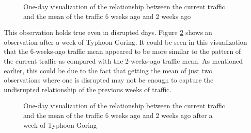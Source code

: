 \begin{figure}[h] 
\centering
  \caption{One-day visualization of the relationship between the current traffic and the mean of the traffic 6 weeks ago and 2 weeks ago}
  \label{figure_traffic_mean_2weeks_vs_6weeks}
\end{figure}



This observation holds true even in disrupted days. Figure \ref{figure_traffic_mean_2weeks_vs_6weeks_disrupted} shows an observation after a week of Typhoon Goring. It could be seen in this visualization that the 6-weeks-ago traffic mean appeared to be more similar to the pattern of the current traffic as compared with the 2-weeks-ago traffic mean. As mentioned earlier, this could be due to the fact that getting the mean of just two observations where one is disrupted may not be enough to capture the undisrupted relationship of the previous weeks of traffic.

\begin{figure}[h] 
\centering
  \centering
  \caption{One-day visualization of the relationship between the current traffic and the mean of the traffic 6 weeks ago and 2 weeks ago after a week of Typhoon Goring}
  \label{figure_traffic_mean_2weeks_vs_6weeks_disrupted}
\end{figure}


